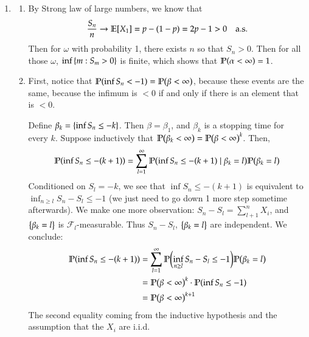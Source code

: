 \documentclass[12pt]{article}
\theoremstyle{definitionstyle}
\newcommand{\SET}[1]{\Set{\mskip-\medmuskip #1 \mskip-\medmuskip}}
\newcommand{\1}{\mathds 1}
\renewcommand{\P}{\mathbb P \qty}
\newcommand{\E}{\mathbb E \qty}
\begin{document}
\begin{enumerate}
        Now knowing that $\P(T \geq n) = \frac{1}{n!}$, we can compute the expected value of $T$ as:
        \begin{align*}
            \E[T] = \sum_{n=1}^\infty \P(T \geq n) = \sum_{n=1}^\infty \frac{1}{n!} = e
        \end{align*}

        Notice that $S_T = \sum_{n=1}^T X_n = \sum_{n=1}^\infty X_n \1_{T \geq n}$. Then as $S_T \geq 0$ and Fubini-Tonelli theorem, we can switch the order of summation and integration to get:
        \begin{align*}
            \E[\sum_{n=1}^\infty X_n \1_{T \geq n}] = \sum_{n=1}^\infty \E[X_n] \P(T \geq n) \\
            &= \sum_{n=1}^\infty \frac 12 \frac{1}{n!} = \frac{e}{2}
        \end{align*}

        \item \begin{enumerate}[label=(\alph*)]
            \item By Strong law of large numbers, we know that 
            \begin{align*}
                \frac{S_n}{n} \to \E[X_1] = p - (1-p) = 2p-1 > 0 \quad \text{a.s.}
            \end{align*}
            Then for $\omega$ with probability 1, there exists $n$ so that $S_n > 0$. Then for all those $\omega$, $\inf \SET{m : S_m > 0}$ is finite, which shows that $\P(\alpha < \infty) = 1$.
            \item First, notice that $\P(\inf S_n < -1) = \P(\beta < \infty)$, because these events are the same, because the infimum is $< 0$ if and only if there is an element that is $< 0$. 

            Define $\beta_k = \SET{\inf S_n \leq -k}$. Then $\beta = \beta_1$, and $\beta_k$ is a stopping time for every $k$. Suppose inductively that $\P(\beta_k < \infty) = \P(\beta < \infty)^k$. Then,
            \begin{align*}
                \P(\inf S_n \leq -(k+1)) = \sum_{l=1}^\infty \P(\inf S_n \leq -(k+1) \mid \beta_k = l) \P(\beta_k = l)
            \end{align*}
            Conditioned on $S_l = -k$, we see that $\inf S_n \leq -(k+1)$ is equivalent to $\inf_{n \geq l} S_n - S_l \leq -1$ (we just need to go down 1 more step sometime afterwards). We make one more observation: $S_n - S_l = \sum_{l+1}^n X_i$, and $\SET{\beta_k = l}$ is $\mathscr{F}_l$-measurable. Thus $S_n - S_l$, $\SET{\beta_k = l}$ are independent. We conclude:
            \begin{align*}
                \P(\inf S_n \leq -(k+1)) &= \sum_{l=1}^\infty \P(\inf_{n \geq l} S_n - S_l \leq -1) \P(\beta_k = l) \\
                &= \P(\beta < \infty)^k \cdot \P(\inf S_n \leq -1) \\
                &= \P(\beta < \infty)^{k+1}
            \end{align*}
            The second equality coming from the inductive hypothesis and the assumption that the $X_i$ are i.i.d. 


\end{enumerate}
\end{enumerate}
\end{document}
